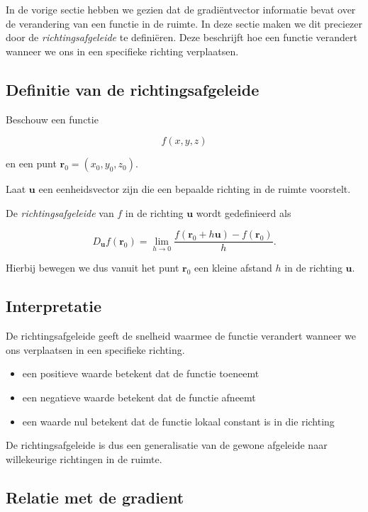 \documentclass[11pt,a4paper]{article}
\begin{document}
    In de vorige sectie hebben we gezien dat de gradiëntvector informatie bevat
    over de verandering van een functie in de ruimte. In deze sectie maken we
    dit preciezer door de \textit{richtingsafgeleide} te definiëren. Deze beschrijft
    hoe een functie verandert wanneer we ons in een specifieke richting
    verplaatsen.

    \subsection{Definitie van de richtingsafgeleide}

    Beschouw een functie

    \[
        f(x,y,z)
    \]

    en een punt $\mathbf{r}_0=(x_0,y_0,z_0)$.

    Laat $\mathbf{u}$ een eenheidsvector zijn die een bepaalde richting in de
    ruimte voorstelt.

    De \textit{richtingsafgeleide} van $f$ in de richting $\mathbf{u}$ wordt
    gedefinieerd als

    \[
        D_{\mathbf{u}} f(\mathbf{r}_0)
        =
        \lim_{h\to 0}
        \frac{f(\mathbf{r}_0 + h\mathbf{u}) - f(\mathbf{r}_0)}{h}.
    \]

    Hierbij bewegen we dus vanuit het punt $\mathbf{r}_0$ een kleine afstand $h$
    in de richting $\mathbf{u}$.

    \subsection{Interpretatie}

    De richtingsafgeleide geeft de snelheid waarmee de functie verandert wanneer
    we ons verplaatsen in een specifieke richting.

    \begin{itemize}
        \item een positieve waarde betekent dat de functie toeneemt
        \item een negatieve waarde betekent dat de functie afneemt
        \item een waarde nul betekent dat de functie lokaal constant is in die richting
    \end{itemize}

    De richtingsafgeleide is dus een generalisatie van de gewone afgeleide naar
    willekeurige richtingen in de ruimte.

    \subsection{Relatie met de gradient}
\end{document}
